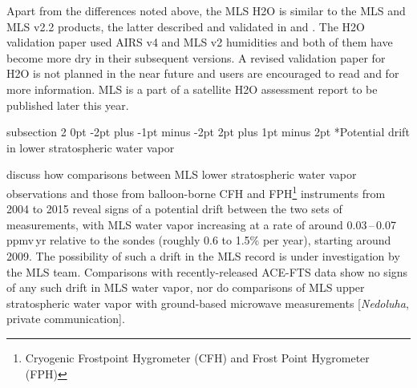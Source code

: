 \documentclass[11pt,draft]{report}
\makeatletter
\renewcommand{\subsection}{\@startsection%
  {subsection}%
  {2}%
  {0pt}%
  {-2pt plus -1pt minus -2pt}%
  {2pt plus 1pt minus 2pt}%
  {\large\sffamily\fontseries{sb}\selectfont\flushleft\color{SectionColor}\figureversion{tabular}}}%
\makeatother
\begin{document}
Apart from the differences noted above, the MLS \thisv H\cs2O is similar
to the MLS \prevvSlash and MLS v2.2 products, the latter described and
validated in \citet{ReadEtal07} and \citet{LambertEtal07}. The H\cs2O
validation paper used AIRS v4 and MLS v2 humidities and both of them
have become more dry in their subsequent versions. A revised validation
paper for H\cs2O is not planned in the near future and users are
encouraged to read \citet{ReadEtal07} and \citet{LambertEtal07} for more
information. MLS \thisv is a part of a satellite H\cs2O assessment
report to be published later this year.

\subsection*{Potential drift in lower stratospheric water vapor}
\label{sec:H2ODrift}

\citet{HurstEtal16} discuss how comparisons between MLS lower
stratospheric water vapor observations and those from balloon-borne CFH
and FPH\footnote{Cryogenic Frostpoint Hygrometer (CFH) and Frost Point
  Hygrometer (FPH)} instruments from 2004 to 2015 reveal signs of a
potential drift between the two sets of measurements, with MLS water
vapor increasing at a rate of around
\mbox{0.03\,--\,0.07\,ppmv\,yr} relative to the sondes (roughly
0.6 to 1.5\% per year), starting around 2009.  The possibility of such a
drift in the MLS record is under investigation by the MLS team.
Comparisons with recently-released ACE-FTS \citep{BernathEtal04} data
show no signs of any such drift in MLS water vapor, nor do comparisons
of MLS upper stratospheric water vapor with ground-based microwave
measurements [\emph{Nedoluha}, private communication].
\end{document}
